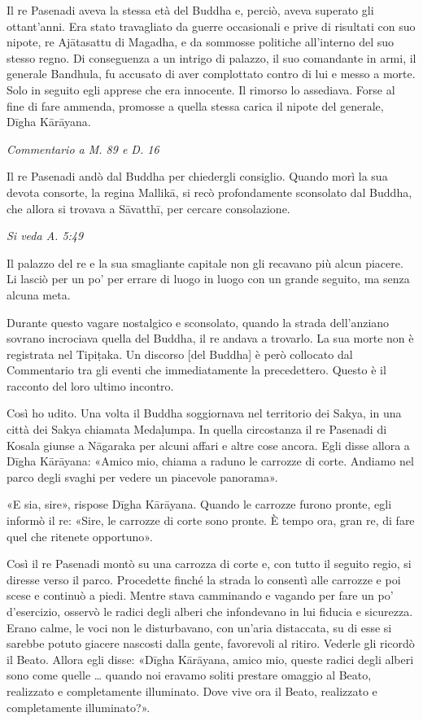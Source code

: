 Il re Pasenadi aveva la stessa età del Buddha e,
perciò, aveva superato gli ottant’anni. Era stato travagliato da guerre
occasionali e prive di risultati con suo nipote, re Ajātasattu di
Magadha, e da sommosse politiche all’interno del suo stesso regno. Di
conseguenza a un intrigo di palazzo, il suo comandante in armi, il
generale Bandhula, fu accusato di aver complottato contro di lui e messo
a morte. Solo in seguito egli apprese che era innocente. Il rimorso lo
assediava. Forse al fine di fare ammenda, promosse a quella stessa
carica il nipote del generale, Dīgha Kārāyana.


\emph{Commentario a M. 89 e D. 16}


 Il re Pasenadi andò dal Buddha per chiedergli
consiglio. Quando morì la sua devota consorte, la regina Mallikā, si
recò profondamente sconsolato dal Buddha, che allora si trovava a
Sāvatthī, per cercare consolazione.


\emph{Si veda A. 5:49}


 Il palazzo del re e la sua smagliante capitale non
gli recavano più alcun piacere. Li lasciò per un po’ per errare di luogo
in luogo con un grande seguito, ma senza alcuna meta.


 Durante questo vagare nostalgico e sconsolato, quando
la strada dell’anziano sovrano incrociava quella del Buddha, il re
andava a trovarlo. La sua morte non è registrata nel Tipiṭaka. Un
discorso [del Buddha] è però collocato dal Commentario tra gli eventi
che immediatamente la precedettero. Questo è il racconto del loro ultimo
incontro.


 Così ho udito. Una volta il Buddha soggiornava nel
territorio dei Sakya, in una città dei Sakya chiamata Medaḷumpa. In
quella circostanza il re Pasenadi di Kosala giunse a Nāgaraka per alcuni
affari e altre cose ancora. Egli disse allora a Dīgha Kārāyana: «Amico
mio, chiama a raduno le carrozze di corte. Andiamo nel parco degli
svaghi per vedere un piacevole panorama».


«E sia, sire», rispose Dīgha Kārāyana. Quando le carrozze furono pronte,
egli informò il re: «Sire, le carrozze di corte sono pronte. È tempo
ora, gran re, di fare quel che ritenete opportuno».


Così il re Pasenadi montò su una carrozza di corte e, con tutto il
seguito regio, si diresse verso il parco. Procedette finché la strada lo
consentì alle carrozze e poi scese e continuò a piedi. Mentre stava
camminando e vagando per fare un po’ d’esercizio, osservò le radici
degli alberi che infondevano in lui fiducia e sicurezza. Erano calme, le
voci non le disturbavano, con un’aria distaccata, su di esse si sarebbe
potuto giacere nascosti dalla gente, favorevoli al ritiro. Vederle gli
ricordò il Beato. Allora egli disse: «Dīgha Kārāyana, amico mio, queste
radici degli alberi sono come quelle … quando noi eravamo soliti
prestare omaggio al Beato, realizzato e completamente illuminato. Dove
vive ora il Beato, realizzato e completamente illuminato?».



